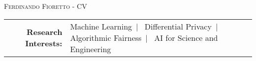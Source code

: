 \documentclass[localFont,alternative]{documentMETADATA}
\begin{document}
\makecvheader\sloppy\allowdisplaybreaks

	\makecvfooter
		{\textsc{}} %
		{\textsc{Ferdinando Fioretto - CV}}
		{\thepage}


	\begin{tabular}{r l} 
	{\bf Research Interests:} &
	{Machine Learning}~|~
	{Differential Privacy}~|~
	{Algorithmic Fairness}~|~
	{AI for Science and Engineering}
	\end{tabular}



\setlength{\LTleft}{-0pt}
		 
\setlength{\LTleft}{-20pt}
	
\setlength{\LTleft}{-0pt}
	
	
	 
	\pagebreak
	          
	
	
\end{document}
